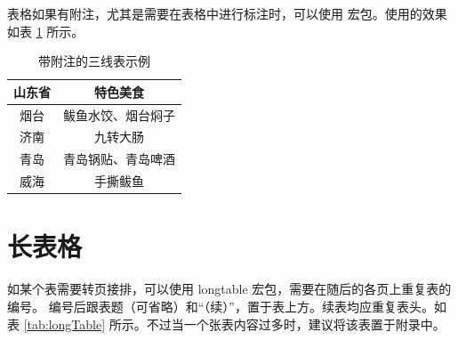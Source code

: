 \documentclass[
    report,     %
    oneside,    %
    UTF8,       %
    zihao=-4    %
]{config} %
\begin{document}
表格如果有附注，尤其是需要在表格中进行标注时，可以使用  宏包。使用的效果如表 \ref{tab:three-line-with-note} 所示。

\begin{table}[H]
    \centering
    \caption{带附注的三线表示例}
    \label{tab:three-line-with-note}
    \renewcommand\arraystretch{0.85} %
    \setlength{\tabcolsep}{15pt} %
    \begin{threeparttable}[c]
        \begin{tabular}{cc}
            \toprule[1.5pt]
            \textbf{山东省}  & \textbf{特色美食}\\
            \midrule[0.8pt]
            烟台           & 鲅鱼水饺、烟台焖子\\
            济南\tnote{a}  & 九转大肠\\
            青岛           & 青岛锅贴、青岛啤酒\\
            威海           & 手撕鲅鱼\\
            \bottomrule[1.5pt]
        \end{tabular}
        \begin{tablenotes}
        \end{tablenotes}
    \end{threeparttable}
\end{table}
\vspace{-0.9em}  %

\section{长表格}

如某个表需要转页接排，可以使用 longtable 宏包，需要在随后的各页上重复表的编号。
编号后跟表题（可省略）和“（续）”，置于表上方。续表均应重复表头。如表 \ref{tab:longTable} 所示。不过当一个张表内容过多时，建议将该表置于附录中。
\end{document}
